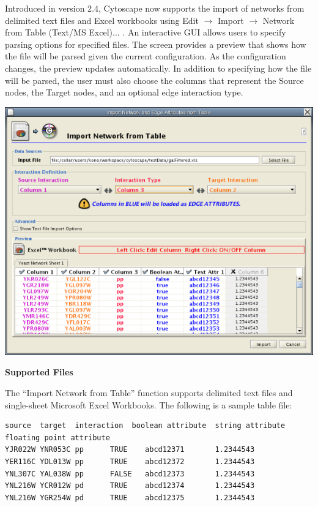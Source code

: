  Introduced in version 2.4, Cytoscape now supports the import of networks from delimited text files and Excel workbooks using Edit $\rightarrow$ Import $\rightarrow$ Network from Table (Text/MS Excel)... . An interactive GUI allows users to specify parsing options for specified files. The screen provides a preview that shows how the file will be parsed given the current configuration. As the configuration changes, the preview updates automatically. In addition to specifying how the file will be parsed, the user must also choose the columns that represent the Source nodes, the Target nodes, and an optional edge interaction type. 


 \includegraphics[wdith=\textwidth]{images/network_table_import.png} 


 \textbf{Supported Files}


 The ``Import Network from Table'' function supports delimited text files and single-sheet Microsoft Excel Workbooks. The following is a sample table file: 


 \begin{verbatim}
source  target  interaction  boolean attribute  string attribute        floating point attribute
YJR022W YNR053C pp      TRUE    abcd12371       1.2344543
YER116C YDL013W pp      TRUE    abcd12372       1.2344543
YNL307C YAL038W pp      FALSE   abcd12373       1.2344543
YNL216W YCR012W pd      TRUE    abcd12374       1.2344543
YNL216W YGR254W pd      TRUE    abcd12375       1.2344543

\end{verbatim}



